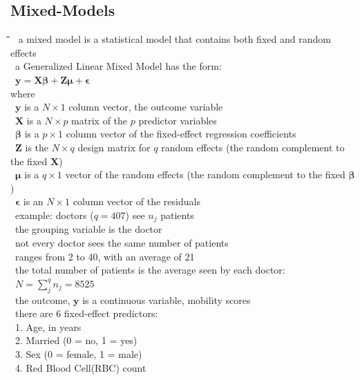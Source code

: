 \documentclass[10pt,letterpaper]{scrartcl}
\newcommand{\tbul}{\textbullet}
\newcommand{\tend}{\>\textendash}
\newcommand{\tasc}{\>\>\textasteriskcentered}
\newcommand{\tabDef}{\hspace{2em}\=\hspace{2em}\=\hspace{2em}\=\hspace{2em}\=\kill}
\begin{document}
\subsection{Mixed-Models}\begin{tabbing}\tabDef
\tbul\ a mixed model is a statistical model that contains both fixed and random effects \\
\tbul\ a Generalized Linear Mixed Model has the form: \\
\>\>\>\>\ $\mathbf{y} = \mathbf{X}\boldsymbol{\beta} + \mathbf{Z}\boldsymbol{\mu} + \boldsymbol{\epsilon}$ \\
where \\
\>\>\>\>\ $\mathbf{y}$ is a $N\times 1$ column vector, the outcome variable \\
\>\>\>\>\ $\mathbf{X}$ is a $N\times p$ matrix of the $p$ predictor variables \\
\>\>\>\>\ $\boldsymbol{\beta}$ is a $p\times 1$ column vector of the fixed-effect regression coefficients \\
\>\>\>\>\ $\mathbf{Z}$ is the $N\times q$ design matrix for $q$ random effects (the random complement to the fixed $\mathbf{X}$) \\
\>\>\>\>\ $\boldsymbol{\mu}$ is a $q\times 1$ vector of the random effects (the random complement to the fixed $\mathbf{\beta}$)\\
\>\>\>\>\ $\boldsymbol{\epsilon}$ is an $N\times 1$ column vector of the residuals \\
\tbul\ example: doctors ($q = 407$) see $n_j$ patients \\
    \tend\ the grouping variable is the doctor \\
    \tend\ not every doctor sees the same number of patients\\
        \tasc\ ranges from 2 to 40, with an average of 21\\
    \tend\ the total number of patients is the average seen by each doctor: \\
\>\>\>\>\ $\displaystyle N = \sum_j^q n_j = 8525$\\
\tbul\ the outcome, $\mathbf{y}$ is a continuous variable, mobility scores \\
\tbul\ there are 6 fixed-effect predictors: \\
\>\ 1. Age, in years\\
\>\ 2. Married (0 = no, 1 = yes) \\
\>\ 3. Sex (0 = female, 1 = male) \\
\>\ 4. Red Blood Cell(RBC) count\\

\end{tabbing}
\end{document}

